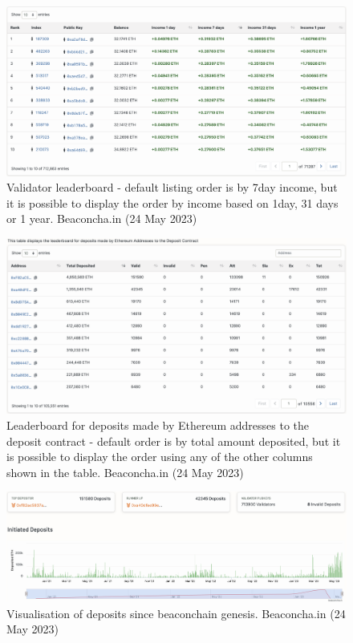 \documentclass[UTF8]{article}
\begin{document}
\begin{figure}[htbp]
\begin{center}
\includegraphics[width=0.9\linewidth]{images/bvalleader}
\caption{Validator leaderboard - default listing order is by 7day income, but it is possible to display the order by income based on 1day, 31 days or 1 year. Beaconcha.in (24 May 2023)}
\label{fig:bvalleader}
\end{center}
\end{figure}

\begin{figure}[htbp]
\begin{center}
\includegraphics[width=0.9\linewidth]{images/bdepleadtbl}
\caption{Leaderboard for deposits made by Ethereum addresses to the deposit contract - default order is by total amount deposited, but it is possible to display the order using any of the other columns shown in the table. Beaconcha.in (24 May 2023)}
\label{fig:bdepleadtbl}
\end{center}
\end{figure}

\begin{figure}[htbp]
\begin{center}
\includegraphics[width=0.9\linewidth]{images/bdeposits}
\caption{Visualisation of deposits since beaconchain genesis. Beaconcha.in (24 May 2023)}
\label{fig:bdeposits}
\end{center}
\end{figure}
\end{document}

